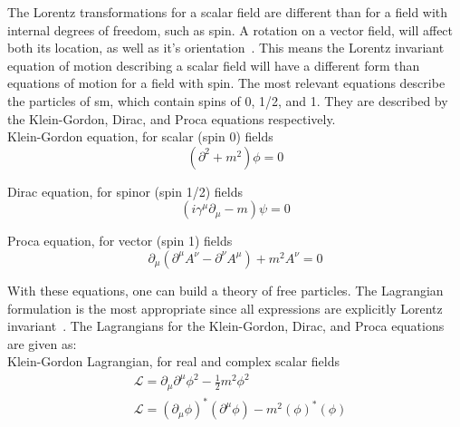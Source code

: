 \par The Lorentz transformations for a scalar field are different than
for a field with internal degrees of freedom, such as spin.  A
rotation on a vector field, will affect both its location, as well as
it's orientation~\cite{Peskin_Schroeder}.  This means the Lorentz
invariant equation of motion describing a scalar field will have a
different form than equations of motion for a field with spin.  The
most relevant equations describe the particles of \acrshort{sm}, which
contain spins of 0, 1/2, and 1.  They are described by the
Klein-Gordon, Dirac, and Proca equations respectively. \\

\noindent Klein-Gordon equation, for scalar (spin 0) fields 
\begin{equation}\label{eq:klein_gordon_eom}
(\partial^{2} + m^{2})\phi = 0  
\end{equation} 

\noindent Dirac equation, for spinor (spin 1/2) fields 
\begin{equation}\label{eq:dirac_eom}
(i\gamma^{\mu}\partial_{\mu} - m)\psi = 0 
\end{equation} 

\noindent Proca equation, for vector (spin 1) fields
\begin{equation}\label{eq:proca_eom}
\partial_{\mu}(\partial^{\mu}A^{\nu} - \partial^{\nu}A^{\mu}) + m^{2}A^{\nu}
= 0 
\end{equation} 

\par With these equations, one can build a theory of free particles.
The Lagrangian formulation is the most appropriate since all
expressions are explicitly Lorentz invariant~\cite{Peskin_Schroeder}.
The Lagrangians for the Klein-Gordon, Dirac, and Proca equations are
given as: \\

\noindent Klein-Gordon Lagrangian, for real and complex scalar fields
\begin{equation}\label{eq:klein_gordon_lagrangian}
\begin{aligned}
& \mathcal{L} = \partial_{\mu}\partial^{\mu}\phi^{2} - \frac{1}{2}m^{2}\phi^{2}  \\
& \mathcal{L} = (\partial_{\mu}\phi)^{\ast}(\partial^{\mu}\phi) - m^{2}(\phi)^{\ast}(\phi) 
\end{aligned}
\end{equation}

